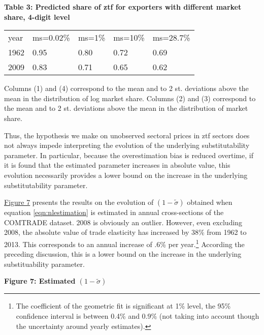 \documentclass[12pt,twoside,a4paper,notitlepage]{article}
\begin{document}
{ 

\textbf{Table 3: Predicted share of ztf for exporters with different market share, 4-digit level \label{ref-006}}

\begin{table}
\begin{tabularx}{\textwidth}{
p{}
p{}
p{}
p{}
p{}}
year & ms=0.02\% & ms=1\% & ms=10\% & ms=28.7\% \\
1962 & 0.95 & 0.80 & 0.72 & 0.69 \\
2009 & 0.83 & 0.71 & 0.65 & 0.62 \\

\end{tabularx}

\end{table}

Columns (1) and (4) correspond to the mean and to 2 st. deviations above the mean in the distribution of log market share. Columns (2) and (3) correspond to the mean and to 2 st. deviations above the mean in the distribution of market share. 

Thus, the hypothesis we make on unobserved sectoral prices in ztf sectors does not always impede interpreting the evolution of the underlying substitutability parameter. In particular, because the overestimation bias is reduced overtime, if it is found that the estimated parameter increases in absolute value, this evolution necessarily provides a lower bound on the increase in the underlying substitutability parameter.

{\hyperref[ref-007]{Figure 7}} presents the results on the evolution of $(1-\tilde{\sigma })$ obtained when equation \ref{eqn:nlestimation} is estimated in annual cross-sections of the COMTRADE dataset. 2008 is obviously an outlier. However, even excluding 2008, the absolute value of trade elasticity has increased by 38\% from 1962 to 2013. This corresponds to an annual increase of .6\% per year.\footnote{The coefficient of the geometric fit is significant at 1\% level, the 95\% confidence interval is between 0.4\% and 0.9\% (not taking into account though the uncertainty around yearly estimates).
}
According the preceding discussion, this is a lower bound on the increase in the underlying substituability parameter. 

\textbf{Figure 7: Estimated $(1-\tilde{\sigma })$ }

}
\end{document}

